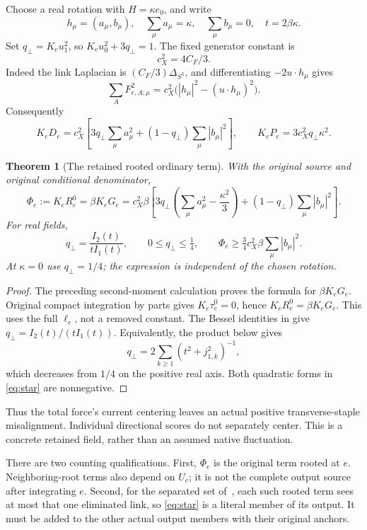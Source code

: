 \documentclass[11pt,letterpaper]{article}
\newtheorem{theorem}{Theorem}[section]
\theoremstyle{remark}\newtheorem{remark}[theorem]{Remark}
\begin{document}
Choose a real rotation with \(H=\kappa e_0\), and write
\[
 h_\mu=(a_\mu,b_\mu),\quad
 \sum_\mu a_\mu=\kappa,\quad \sum_\mu b_\mu=0,\quad
 t=2\beta\kappa.
\]
Set \(q_\perp=K_eu_1^2\), so \(K_eu_0^2+3q_\perp=1\). The fixed generator constant is
\[
 c_X^2=4C_F/3.
\]
Indeed the link Laplacian is \((C_F/3)\Delta_{S^3}\), and differentiating \(-2u\cdot h_\mu\) gives
\[
 \sum_A F_{e,A;\mu}^2
 =c_X^2\bigl(|h_\mu|^2-(u\cdot h_\mu)^2\bigr).
\]
Consequently
\[
 K_eD_e=c_X^2\left[
 3q_\perp\sum_\mu a_\mu^2+
 (1-q_\perp)\sum_\mu|b_\mu|^2\right],
 \qquad K_eP_e=3c_X^2q_\perp\kappa^2.
\]

\begin{theorem}[The retained rooted ordinary term]\label{thm:star}
With the original source and original conditional denominator,
\begin{equation}\label{eq:star}
 \boxed{\quad
 \Phi_e:=K_eR_e^0=\beta K_eG_e
 =c_X^2\beta\left[
 3q_\perp\left(\sum_\mu a_\mu^2-\frac{\kappa^2}{3}\right)
 +(1-q_\perp)\sum_\mu|b_\mu|^2\right].
 \quad}
\end{equation}
For real fields,
\[
 q_\perp=\frac{I_2(t)}{tI_1(t)},\qquad 0\le q_\perp\le\tfrac14,
 \qquad
 \Phi_e\ge\tfrac34c_X^2\beta\sum_\mu|b_\mu|^2.
\]
At \(\kappa=0\) use \(q_\perp=1/4\); the expression is independent of the chosen rotation.
\end{theorem}
\begin{proof}
The preceding second-moment calculation proves the formula for \(\beta K_eG_e\). Original compact integration by parts gives \(K_e\tau_e^0=0\), hence \(K_eR_e^0=\beta K_eG_e\). This uses the full \(\ell_e\), not a removed constant.
The Bessel identities in \cite{DLMF} give \(q_\perp=I_2(t)/(tI_1(t))\). Equivalently, the product below gives
\[
 q_\perp=2\sum_{k\ge1}(t^2+j_{1,k}^2)^{-1},
\]
which decreases from \(1/4\) on the positive real axis.
Both quadratic forms in \eqref{eq:star} are nonnegative.
\end{proof}

Thus the total force's current centering leaves an actual positive transverse-staple misalignment. Individual directional scores do not separately center. This is a concrete retained field, rather than an assumed native fluctuation.

There are two counting qualifications. First, \(\Phi_e\) is the original term rooted at \(e\). Neighboring-root terms also depend on \(U_e\); it is not the complete output source after integrating \(e\). Second, for the separated set of~\cite{SZ}, each such rooted term sees at most that one eliminated link, so \eqref{eq:star} is a literal member of its output. It must be added to the other actual output members with their original anchors.
\end{document}

